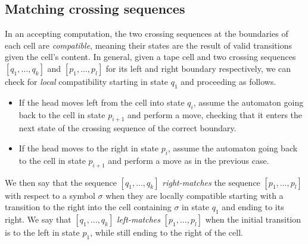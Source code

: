 \subsection{Matching crossing sequences}
In an accepting computation, the two crossing sequences at the boundaries of each cell are \emph{compatible}, meaning their states are the result of valid transitions given the cell's content.
In general, given a tape cell and two crossing sequences $[q_1,\dots,q_k]$ and $[p_1,\dots,p_l]$ for its left and right boundary respectively, we can check for \emph{local} compatibility starting in state $q_1$ and proceeding as follows.
\begin{itemize}
	\item If the head moves left from the cell into state $q_i$, assume the automaton going back to the cell in state $p_{i+1}$ and perform a move, checking that it enters the next state of the crossing sequence of the correct boundary.
	\item If the head moves to the right in state $p_i$, assume the automaton going back to the cell in state $p_{i+1}$ and perform a move as in the previous case.
\end{itemize}

We then say that the sequence $[q_1,\dots,q_k]$ \emph{right-matches} the sequence $[p_1,\dots,p_l]$ with respect to a symbol $\sigma$ when they are locally compatible starting with a transition to the right into the cell containing $\sigma$ in state $q_1$ and ending to its right.
We say that $[q_1,\dots,q_k]$ \emph{left-matches} $[p_1,\dots,p_l]$ when the initial transition is to the left in state $p_1$, while still ending to the right of the cell.

